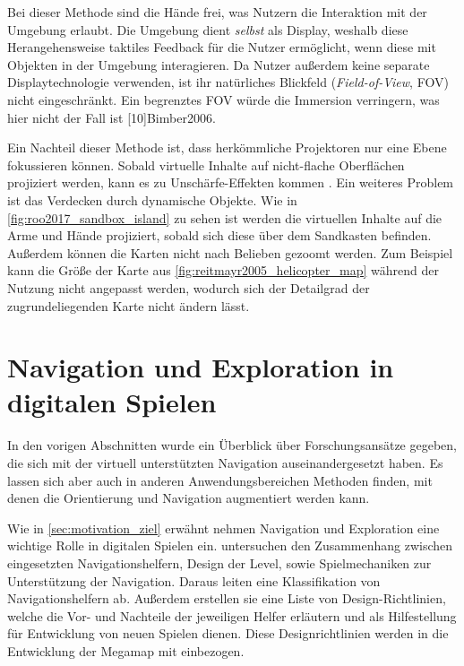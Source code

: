 Bei dieser Methode sind die Hände frei, was Nutzern die Interaktion mit der Umgebung erlaubt.
Die Umgebung dient \emph{selbst} als Display, weshalb diese Herangehensweise taktiles Feedback für die Nutzer ermöglicht, wenn diese mit Objekten in der Umgebung interagieren.
Da Nutzer außerdem keine separate Displaytechnologie verwenden, ist ihr natürliches Blickfeld (\emph{Field-of-View}, FOV) nicht eingeschränkt.
Ein begrenztes FOV würde die Immersion verringern, was hier nicht der Fall ist \parencite[3\pageff]{Krevelen2010}[10]{Bimber2006}.

Ein Nachteil dieser Methode ist, dass herkömmliche Projektoren nur eine Ebene fokussieren können.
Sobald virtuelle Inhalte auf nicht-flache Oberflächen projiziert werden, kann es zu Unschärfe-Effekten kommen \parencite[10]{Bimber2006}.
Ein weiteres Problem ist das Verdecken durch dynamische Objekte.
Wie in \autoref{fig:roo2017_sandbox_island} zu sehen ist werden die virtuellen Inhalte auf die Arme und Hände projiziert, sobald sich diese über dem Sandkasten befinden.
Außerdem können die Karten nicht nach Belieben gezoomt werden.
Zum Beispiel kann die Größe der Karte aus \autoref{fig:reitmayr2005_helicopter_map} während der Nutzung nicht angepasst werden, wodurch sich der Detailgrad der zugrundeliegenden Karte nicht ändern lässt.

\section{Navigation und Exploration in digitalen Spielen}
In den vorigen Abschnitten wurde ein Überblick über Forschungsansätze gegeben, die sich mit der virtuell unterstützten Navigation auseinandergesetzt haben.
Es lassen sich aber auch in anderen Anwendungsbereichen Methoden finden, mit denen die Orientierung und Navigation augmentiert werden kann.

Wie in \autoref{sec:motivation_ziel} erwähnt nehmen Navigation und Exploration eine wichtige Rolle in digitalen Spielen ein.
\textcites{Moura2014}{Moura2015} untersuchen den Zusammenhang zwischen eingesetzten Navigationshelfern, Design der Level, sowie Spielmechaniken zur Unterstützung der Navigation.
Daraus leiten \textcite{Moura2015} eine Klassifikation von Navigationshelfern ab.
Außerdem erstellen sie eine Liste von Design-Richtlinien, welche die Vor- und Nachteile der jeweiligen Helfer erläutern und als Hilfestellung für Entwicklung von neuen Spielen dienen.
Diese Designrichtlinien werden in die Entwicklung der Megamap mit einbezogen.

